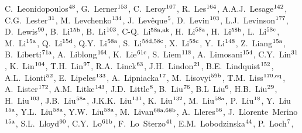 \begin{flushleft}
C.~Leonidopoulos$^\textrm{\scriptsize 48}$,    
G.~Lerner$^\textrm{\scriptsize 153}$,    
C.~Leroy$^\textrm{\scriptsize 107}$,    
R.~Les$^\textrm{\scriptsize 164}$,    
A.A.J.~Lesage$^\textrm{\scriptsize 142}$,    
C.G.~Lester$^\textrm{\scriptsize 31}$,    
M.~Levchenko$^\textrm{\scriptsize 134}$,    
J.~Lev\^eque$^\textrm{\scriptsize 5}$,    
D.~Levin$^\textrm{\scriptsize 103}$,    
L.J.~Levinson$^\textrm{\scriptsize 177}$,    
D.~Lewis$^\textrm{\scriptsize 90}$,    
B.~Li$^\textrm{\scriptsize 15b}$,    
B.~Li$^\textrm{\scriptsize 103}$,    
C-Q.~Li$^\textrm{\scriptsize 58a,ak}$,    
H.~Li$^\textrm{\scriptsize 58a}$,    
H.~Li$^\textrm{\scriptsize 58b}$,    
L.~Li$^\textrm{\scriptsize 58c}$,    
M.~Li$^\textrm{\scriptsize 15a}$,    
Q.~Li$^\textrm{\scriptsize 15d}$,    
Q.Y.~Li$^\textrm{\scriptsize 58a}$,    
S.~Li$^\textrm{\scriptsize 58d,58c}$,    
X.~Li$^\textrm{\scriptsize 58c}$,    
Y.~Li$^\textrm{\scriptsize 148}$,    
Z.~Liang$^\textrm{\scriptsize 15a}$,    
B.~Liberti$^\textrm{\scriptsize 71a}$,    
A.~Liblong$^\textrm{\scriptsize 164}$,    
K.~Lie$^\textrm{\scriptsize 61c}$,    
S.~Liem$^\textrm{\scriptsize 118}$,    
A.~Limosani$^\textrm{\scriptsize 154}$,    
C.Y.~Lin$^\textrm{\scriptsize 31}$,    
K.~Lin$^\textrm{\scriptsize 104}$,    
T.H.~Lin$^\textrm{\scriptsize 97}$,    
R.A.~Linck$^\textrm{\scriptsize 63}$,    
J.H.~Lindon$^\textrm{\scriptsize 21}$,    
B.E.~Lindquist$^\textrm{\scriptsize 152}$,    
A.L.~Lionti$^\textrm{\scriptsize 52}$,    
E.~Lipeles$^\textrm{\scriptsize 133}$,    
A.~Lipniacka$^\textrm{\scriptsize 17}$,    
M.~Lisovyi$^\textrm{\scriptsize 59b}$,    
T.M.~Liss$^\textrm{\scriptsize 170,aq}$,    
A.~Lister$^\textrm{\scriptsize 172}$,    
A.M.~Litke$^\textrm{\scriptsize 143}$,    
J.D.~Little$^\textrm{\scriptsize 8}$,    
B.~Liu$^\textrm{\scriptsize 76}$,    
B.L~Liu$^\textrm{\scriptsize 6}$,    
H.B.~Liu$^\textrm{\scriptsize 29}$,    
H.~Liu$^\textrm{\scriptsize 103}$,    
J.B.~Liu$^\textrm{\scriptsize 58a}$,    
J.K.K.~Liu$^\textrm{\scriptsize 131}$,    
K.~Liu$^\textrm{\scriptsize 132}$,    
M.~Liu$^\textrm{\scriptsize 58a}$,    
P.~Liu$^\textrm{\scriptsize 18}$,    
Y.~Liu$^\textrm{\scriptsize 15a}$,    
Y.L.~Liu$^\textrm{\scriptsize 58a}$,    
Y.W.~Liu$^\textrm{\scriptsize 58a}$,    
M.~Livan$^\textrm{\scriptsize 68a,68b}$,    
A.~Lleres$^\textrm{\scriptsize 56}$,    
J.~Llorente~Merino$^\textrm{\scriptsize 15a}$,    
S.L.~Lloyd$^\textrm{\scriptsize 90}$,    
C.Y.~Lo$^\textrm{\scriptsize 61b}$,    
F.~Lo~Sterzo$^\textrm{\scriptsize 41}$,    
E.M.~Lobodzinska$^\textrm{\scriptsize 44}$,    
P.~Loch$^\textrm{\scriptsize 7}$,    

\end{flushleft}
